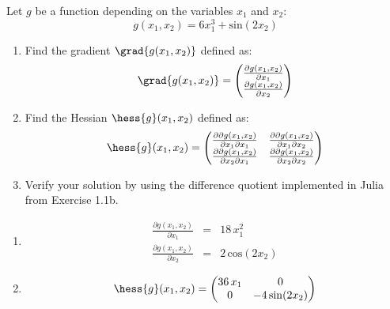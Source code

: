 \begin{exercise}[subtitle={Paper + Jupyter Notebook}]
  Let $g$ be a function depending on the variables $x_1$ and $x_2$:
\begin{equation}
g(x_1,x_2) =  6 x_1^3 + \mathrm{sin}(2x_2)
\end{equation}
\begin{enumerate}[label=\emph{\alph*)}]
\item Find the gradient $\grad{g(x_1,x_2)}$ defined as:
\begin{eqnarray}
\grad{g(x_1,x_2)} = \begin{pmatrix} \frac{\partial g(x_1,x_2)}{\partial x_1} \\ \frac{\partial g(x_1,x_2)}{\partial x_2}  \end{pmatrix}
\end{eqnarray}
\item Find the Hessian $\hess{g}(x_1,x_2)$ defined as:
\begin{equation}
\hess{g}(x_1,x_2) = \begin{pmatrix} \frac{\partial\partial g(x_1,x_2)}{\partial x_1 \partial x_1} &  \frac{\partial\partial g(x_1,x_2)}{\partial x_1 \partial x_2} \\
\frac{\partial \partial g(x_1,x_2)}{\partial x_2 \partial x_1}  & \frac{\partial\partial g(x_1,x_2)}{\partial x_2 \partial x_2}
\end{pmatrix}
\end{equation}
\item Verify your solution by using the difference quotient implemented in Julia from Exercise 1.1b.
\end{enumerate}
\end{exercise}


\begin{solution}[print=true]
\begin{enumerate}[label=\emph{\alph*)}]
\item \begin{eqnarray*}
\frac{\partial g(x_1,x_2)}{\partial x_1} &=& 18\,x_1^2\\
\frac{\partial g(x_1,x_2)}{\partial x_2} &=& 2\,\mathrm{cos}(2x_2)
\end{eqnarray*}
\item \begin{align*}
\hess{g}(x_1,x_2) = \begin{pmatrix}
36\,x_1 & 0\\
0 & -4\,\mathrm{sin}(2x_2)
\end{pmatrix}
\end{align*}
\end{enumerate}

\end{solution}


